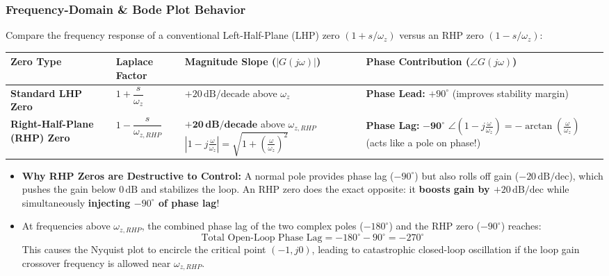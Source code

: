 \subsubsection{Frequency-Domain \& Bode Plot Behavior}
Compare the frequency response of a conventional Left-Half-Plane (LHP) zero $(1 + s/\omega_z)$ versus an RHP zero $(1 - s/\omega_z)$:
\begin{center}
\footnotesize
\renewcommand{\arraystretch}{1.2}
\begin{tabularx}{\textwidth}{@{} >{\raggedright\arraybackslash}p{3.5cm} >{\raggedright\arraybackslash}p{4.0cm} >{\raggedright\arraybackslash}p{4.0cm} >{\raggedright\arraybackslash}X @{}}
\toprule
\textbf{Zero Type} & \textbf{Laplace Factor} & \textbf{Magnitude Slope ($|G(j\omega)|$)} & \textbf{Phase Contribution ($\angle G(j\omega)$)} \\
\midrule
\textbf{Standard LHP Zero} &
$1 + \dfrac{s}{\omega_z}$ &
$+20\,\text{dB/decade}$ above $\omega_z$ &
\textbf{Phase Lead:} $+90^\circ$ \newline (improves stability margin) \\
\midrule
\textbf{Right-Half-Plane (RHP) Zero} &
$1 - \dfrac{s}{\omega_{z,RHP}}$ &
$\mathbf{+20\,\text{dB/decade}}$ above $\omega_{z,RHP}$ \newline
$\left|1 - j\frac{\omega}{\omega_z}\right| = \sqrt{1 + \left(\frac{\omega}{\omega_z}\right)^2}$ &
\textbf{Phase Lag:} $\mathbf{-90^\circ}$ \newline
$\angle\left(1 - j\frac{\omega}{\omega_z}\right) = -\arctan\left(\frac{\omega}{\omega_z}\right)$ \newline
(acts like a pole on phase!) \\
\bottomrule
\end{tabularx}
\end{center}

\begin{itemize}
  \item \textbf{Why RHP Zeros are Destructive to Control:} A normal pole provides phase lag ($-90^\circ$) but also rolls off gain ($-20\,\text{dB/dec}$), which pushes the gain below $0\,\text{dB}$ and stabilizes the loop. An RHP zero does the exact opposite: it \textbf{boosts gain by $+20\,\text{dB/dec}$} while simultaneously \textbf{injecting $-90^\circ$ of phase lag}!
  \item At frequencies above $\omega_{z,RHP}$, the combined phase lag of the two complex poles ($-180^\circ$) and the RHP zero ($-90^\circ$) reaches:
  \begin{equation}
  \text{Total Open-Loop Phase Lag} = -180^\circ - 90^\circ = -270^\circ
  \end{equation}
  This causes the Nyquist plot to encircle the critical point $(-1, j0)$, leading to catastrophic closed-loop oscillation if the loop gain crossover frequency is allowed near $\omega_{z,RHP}$.
\end{itemize}

